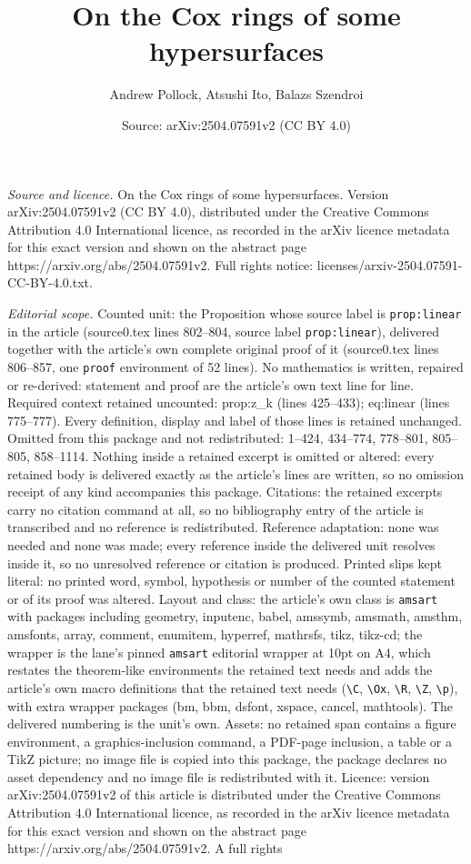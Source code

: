 \documentclass[10pt,a4paper]{amsart}
\title[On the Cox rings of some hypersurfaces]{On the Cox rings of some hypersurfaces}
\author{Andrew Pollock, Atsushi Ito, Balazs Szendroi}
\date{Source: arXiv:2504.07591v2 (CC BY 4.0)}
\begin{document}
\maketitle

\noindent\emph{Source and licence.} On the Cox rings of some hypersurfaces. Version arXiv:2504.07591v2 (CC BY 4.0), distributed under the Creative Commons Attribution 4.0 International licence, as recorded in the arXiv licence metadata for this exact version and shown on the abstract page https://arxiv.org/abs/2504.07591v2. Full rights notice: licenses/arxiv-2504.07591-CC-BY-4.0.txt.\par\smallskip

\noindent\textit{Editorial scope.} Counted unit: the Proposition whose source label is \texttt{prop:linear} in the article (source0.tex lines 802--804, source label \texttt{prop:linear}), delivered together with the article's own complete original proof of it (source0.tex lines 806--857, one \texttt{proof} environment of 52 lines). No mathematics is written, repaired or re-derived: statement and proof are the article's own text line for line. Required context retained uncounted: prop:z\_k (lines 425--433); eq:linear (lines 775--777). Every definition, display and label of those lines is retained unchanged. Omitted from this package and not redistributed: 1--424, 434--774, 778--801, 805--805, 858--1114. Nothing inside a retained excerpt is omitted or altered: every retained body is delivered exactly as the article's lines are written, so no omission receipt of any kind accompanies this package. Citations: the retained excerpts carry no citation command at all, so no bibliography entry of the article is transcribed and no reference is redistributed. Reference adaptation: none was needed and none was made; every reference inside the delivered unit resolves inside it, so no unresolved reference or citation is produced. Printed slips kept literal: no printed word, symbol, hypothesis or number of the counted statement or of its proof was altered. Layout and class: the article's own class is \texttt{amsart} with packages including geometry, inputenc, babel, amssymb, amsmath, amsthm, amsfonts, array, comment, enumitem, hyperref, mathrsfs, tikz, tikz-cd; the wrapper is the lane's pinned \texttt{amsart} editorial wrapper at 10pt on A4, which restates the theorem-like environments the retained text needs and adds the article's own macro definitions that the retained text needs (\texttt{\textbackslash C}, \texttt{\textbackslash Ox}, \texttt{\textbackslash R}, \texttt{\textbackslash Z}, \texttt{\textbackslash p}), with extra wrapper packages (bm, bbm, dsfont, xspace, cancel, mathtools). The delivered numbering is the unit's own. Assets: no retained span contains a figure environment, a graphics-inclusion command, a PDF-page inclusion, a table or a TikZ picture; no image file is copied into this package, the package declares no asset dependency and no image file is redistributed with it. Licence: version arXiv:2504.07591v2 of this article is distributed under the Creative Commons Attribution 4.0 International licence, as recorded in the arXiv licence metadata for this exact version and shown on the abstract page https://arxiv.org/abs/2504.07591v2. A full rights 
\end{document}
